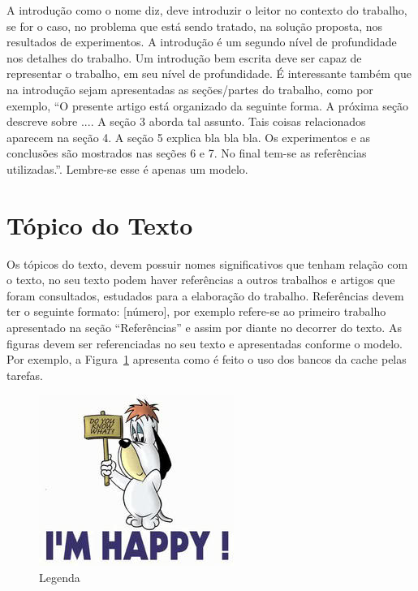 \documentclass[times, 10pt,twocolumn]{article}
\begin{document}
\begin{savenotes}
A introdução como o nome diz, deve introduzir o leitor no contexto do trabalho, se for o caso, no problema que está sendo tratado, na solução proposta, nos resultados de experimentos. A introdução é um segundo nível de profundidade nos detalhes do trabalho. Um introdução bem escrita deve ser capaz de representar o trabalho, em seu nível de profundidade. É interessante também que na introdução sejam apresentadas as seções/partes do trabalho, como por exemplo,  “O presente artigo está organizado da seguinte forma. A próxima seção descreve sobre .... A seção 3 aborda tal assunto. Tais coisas relacionados aparecem na seção 4. A seção 5 explica bla bla bla. Os experimentos e as conclusões são mostrados nas seções 6 e 7. No final tem-se as referências utilizadas.”. Lembre-se esse é apenas um modelo.

\end{savenotes}

\section{Tópico do Texto} \label{sec_topico_texto}
Os tópicos do texto, devem possuir nomes significativos que tenham relação com o texto, no seu texto podem haver referências a outros trabalhos e artigos que foram consultados, estudados para a elaboração do trabalho. Referências devem ter o seguinte formato: [número], por exemplo \cite{Codishetal2000} refere-se ao primeiro trabalho apresentado na seção “Referências” e assim por diante no decorrer do texto.
As figuras devem ser referenciadas no seu texto e apresentadas conforme o modelo. Por exemplo, a Figura~{\ref{fig:figura-001}} apresenta como é feito o uso dos bancos da cache pelas tarefas.

\begin{figure}[!htb]
    \centering
    \includegraphics{figuras/droopy.jpg}
    \caption{Legenda}
    \label{fig:figura-001}
\end{figure}
\end{document}
